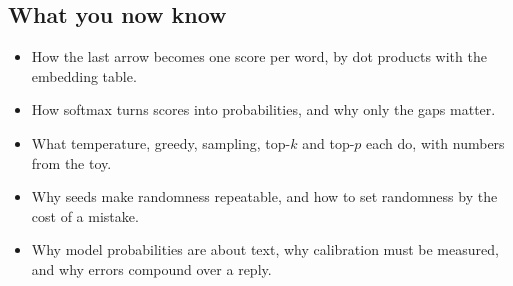 \subsection*{What you now know}
\begin{itemize}
\item How the last arrow becomes one score per word, by dot products with the embedding table.
\item How softmax turns scores into probabilities, and why only the gaps matter.
\item What temperature, greedy, sampling, top-$k$ and top-$p$ each do, with numbers from the toy.
\item Why seeds make randomness repeatable, and how to set randomness by the cost of a mistake.
\item Why model probabilities are about text, why calibration must be measured, and why errors compound over a reply.
\end{itemize}

